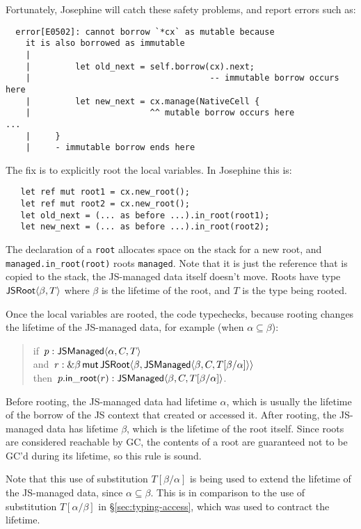 Fortunately, Josephine will catch these safety problems, and report
errors such as:
\begin{verbatim}
  error[E0502]: cannot borrow `*cx` as mutable because
    it is also borrowed as immutable
    |
    |         let old_next = self.borrow(cx).next;
    |                                    -- immutable borrow occurs here
    |         let new_next = cx.manage(NativeCell {
    |                        ^^ mutable borrow occurs here
...
    |     }
    |     - immutable borrow ends here
\end{verbatim}
The fix is to explicitly root the local variables. In Josephine this is:
\begin{verbatim}
   let ref mut root1 = cx.new_root();
   let ref mut root2 = cx.new_root();
   let old_next = (... as before ...).in_root(root1);
   let new_next = (... as before ...).in_root(root2);
\end{verbatim}
The declaration of a \verb|root| allocates space on the stack
for a new root, and \verb|managed.in_root(root)| roots \verb|managed|.
Note that it is just the reference that is copied to the stack,
the JS-managed data itself doesn't move.
Roots have type $\mathsf{JSRoot}\langle \beta,T\rangle$ where $\beta$ is the lifetime
of the root, and $T$ is the type being rooted.

Once the local variables are rooted, the code typechecks,
because rooting changes the lifetime of the JS-managed
data, for example (when $\alpha \subseteq \beta$):
\begin{quote}
  if~$p: \mathsf{JSManaged}\langle \alpha,C,T\rangle$ \\
  and~$r: \&\beta\,\mathsf{mut}\,{\mathsf{JSRoot}\langle \beta,\mathsf{JSManaged}\langle \beta,C,T[\beta/\alpha]\rangle\rangle}$ \\
  then~$p.\mathsf{in\_root}(r): \mathsf{JSManaged}\langle \beta,C,T[\beta/\alpha]\rangle$.
\end{quote}
Before rooting, the JS-managed data had lifetime $\alpha$,
which is usually the lifetime of the borrow of the JS context
that created or accessed it.
After rooting, the JS-managed data has lifetime $\beta$,
which is the lifetime of the root itself. Since roots are
considered reachable by GC, the contents of a root
are guaranteed not to be GC'd during its lifetime,
so this rule is sound.

Note that this use of substitution $T[\beta/\alpha]$
is being used to extend the lifetime of the
JS-managed data, since $\alpha\subseteq\beta$. This
is in comparison to the use of substitution $T[\alpha/\beta]$
in \S\ref{sec:typing-access}, which was used to contract the
lifetime.

